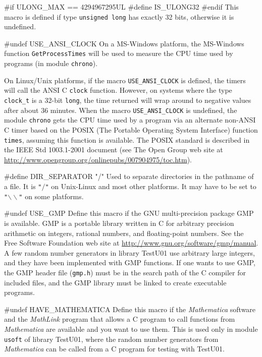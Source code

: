 #if ULONG_MAX == 4294967295UL
#define IS_ULONG32
#endif
\endcode
  \tab This macro is defined if type \texttt {unsigned long} has
  exactly 32 bits, otherwise it is undefined.
 \endtab
\endhide
\code


#undef USE_ANSI_CLOCK
\endcode
  \tab On a MS-Windows platform,
  the MS-Windows function \texttt{GetProcessTimes} will be used to measure
  the CPU time used by programs (in module \texttt{chrono}).

  On Linux/Unix platforms, if the macro
  \texttt{USE\_ANSI\_CLOCK} is defined, the timers %
  will call the ANSI C  \texttt{clock} function. However, on systems
  where the type \texttt{clock\_t} is a 32-bit \texttt{long},
  the time returned
  will wrap around to negative values after about 36 minutes.
  When the macro \texttt{USE\_ANSI\_CLOCK} is undefined, the
  module \texttt{chrono} gets the CPU time used by a program via an 
  alternate non-ANSI C timer 
  based on the POSIX (The Portable Operating System Interface)
  function \texttt{times}, assuming this function is available. The POSIX
  standard is described in the IEEE Std 1003.1-2001 document (see 
  The Open Group web site at
  \url{http://www.opengroup.org/onlinepubs/007904975/toc.htm}).
 \endtab
\code


#define DIR_SEPARATOR "/"
\endcode
  \tab Used to separate directories in the pathname of a file.
  It is \texttt{"$/$"} on {Unix-Linux} and most other platforms. 
  It may have to be set to \texttt{"$\backslash\backslash$"} on some platforms.
 \endtab
\code


#undef USE_GMP
\endcode
  \tab  Define this macro if the GNU multi-precision package GMP
  is available.  GMP is a portable library written in C for arbitrary
  precision arithmetic on integers, rational numbers, and floating-point
  numbers. See the Free Software Foundation web site at
  \url{http://www.gnu.org/software/gmp/manual}. A few random number
  generators in library TestU01 use arbitrary large integers, and they
  have been implemented with GMP functions. If one wants to use GMP, the
  GMP header file (\texttt{gmp.h}) must be in the  search path 
  of the C compiler for included files, and the GMP library must be 
  linked to create executable programs.
 \endtab
\code


#undef HAVE_MATHEMATICA
\endcode
  \tab  Define this macro if the {\em Mathematica\/}
    software \cite{mWOL96a}
   and the {\em MathLink} program that allows a C program to call
   functions from {\em Mathematica} are available and you want to use them.
   This is used only in module \texttt{usoft} 
   of library TestU01, where the random number generators from 
   {\em Mathematica} can be called from a C program for testing with TestU01.

